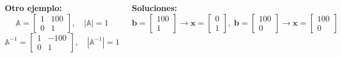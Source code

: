 \documentclass[9pt, aspectratio=169]{beamer}
\begin{document}
\begin{frame}[fragile]
	\begin{columns}[t]
		\cx

		\textbf{Otro ejemplo:}
		\[ \mathbb{A} = \begin{bmatrix} 1 & 100 \\ 0 & 1 \end{bmatrix}, \quad |\mathbb{A}| = 1 \]
		\[ \mathbb{A}^{-1} = \begin{bmatrix} 1 & -100 \\ 0 & 1 \end{bmatrix}, \quad |\mathbb{A}^{-1}| = 1 \]
		\pause

		\textbf{Soluciones:}
		\[ \bm{b} = \begin{bmatrix} 100 \\ 1 \end{bmatrix} \rightarrow \bm{x} = \begin{bmatrix} 0 \\ 1 \end{bmatrix}, \; \bm{b} = \begin{bmatrix} 100 \\ 0 \end{bmatrix} \rightarrow \bm{x} = \begin{bmatrix} 100 \\ 0 \end{bmatrix}  \]
		 \pause

		\cx
	\end{columns}
\end{frame}
\end{document}
